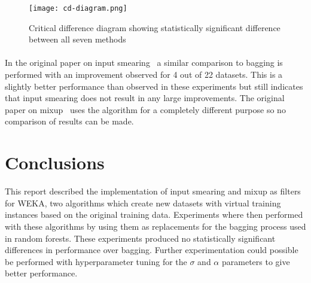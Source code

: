 \documentclass{article}
\begin{document}
\begin{figure}
\texttt{[image: cd-diagram.png]}
\caption{Critical difference diagram showing statistically significant difference between all seven methods}
\label{difference}
\end{figure}

\paragraph{}

In the original paper on input smearing~\cite{smear} a similar comparison to bagging is performed with an improvement observed for 4 out of 22 datasets. This is a slightly better performance than observed in these experiments but still indicates that input smearing does not result in any large improvements. The original paper on mixup~\cite{mixup} uses the algorithm for a completely different purpose so no comparison of results can be made.

\section{Conclusions}

This report described the implementation of input smearing and mixup as filters for WEKA, two algorithms which create new datasets with virtual training instances based on the original training data. Experiments where then performed with these algorithms by using them as replacements for the bagging process used in random forests. These experiments produced no statistically significant differences in performance over bagging. Further experimentation could possible be performed with hyperparameter tuning for the $\sigma$ and $\alpha$ parameters to give better performance.



\end{document}
